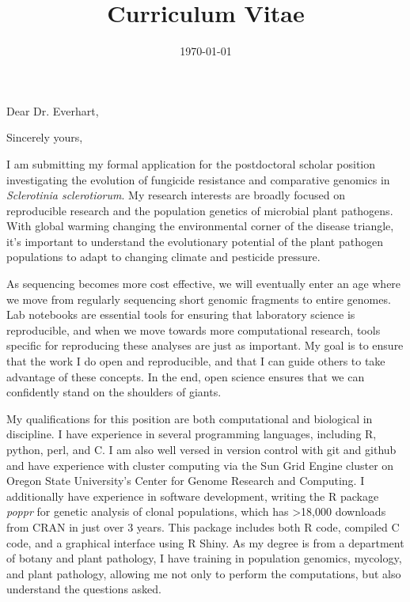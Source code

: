 \documentclass[11pt,letterpaper,sans]{moderncv} %
\title{Curriculum Vitae}
\begin{document}
\date{\today} %
\opening{Dear Dr. Everhart,} %
\closing{Sincerely yours,} %

\makelettertitle %

I am submitting my formal application for the postdoctoral scholar position 
investigating the evolution of fungicide resistance and comparative genomics in
\textit{Sclerotinia sclerotiorum}. My research interests are broadly focused on
reproducible research and the population genetics of microbial plant pathogens.
With global warming changing the environmental corner of the disease triangle,
it's important to understand the evolutionary potential of the plant pathogen
populations to adapt to changing climate and pesticide pressure. 

As sequencing becomes more cost effective, we will eventually enter an age where
we move from regularly sequencing short genomic fragments to entire genomes. Lab
notebooks are essential tools for ensuring that laboratory science is
reproducible, and when we move towards more computational research, tools
specific for reproducing these analyses are just as important. My goal is to
ensure that the work I do open and reproducible, and that I can guide others to
take advantage of these concepts. In the end, open science ensures that we can
confidently stand on the shoulders of giants.

My qualifications for this position are both computational and biological in
discipline. I have experience in several programming languages, including R,
python, perl, and C. I am also well versed in version control with git and
github and have experience with cluster computing via the Sun Grid Engine
cluster on Oregon State University's Center for Genome Research and Computing. I
additionally have experience in software development, writing the R package
\textit{poppr} for genetic analysis of clonal populations, which has >18,000
downloads from CRAN in just over 3 years. This package includes both R code,
compiled C code, and a graphical interface using R Shiny. As my degree is from a
department of botany and plant pathology, I have training in population
genomics, mycology, and plant pathology, allowing me not only to perform the
computations, but also understand the questions asked.
\end{document}
